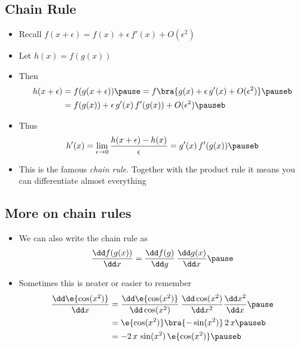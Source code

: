 \begin{slide}
\section[-2]{Chain Rule}

\begin{PauseHighLight}
  \begin{itemize}
  \item Recall $f(x+\epsilon) = f(x) + \epsilon\, f'(x) + O(\epsilon^2)$
  \item Let $h(x) = f(g(x))$\pause
  \item Then
    \begin{align*}
      h(x+\epsilon) &= f(g(x+\epsilon)) \pause= f\bra{g(x) + \epsilon\,g'(x) +
                      O(\epsilon^2)}\pauseb\\
      &= f(g(x)) + \epsilon\, g'(x)\, f'(g(x)) + O(\epsilon^2)\pauseb
    \end{align*}
  \item Thus
    \begin{align*}
      h'(x) =  \lim_{\epsilon\rightarrow 0} \frac{h(x+\epsilon)  -
      h(x)}{\epsilon} = g'(x)\, f'(g(x)) \pauseb
    \end{align*}
  \item This is the famous \emph{chain rule}\pauseb. Together with the
    product rule it means you can differentiate almost everything\pauseb
  \end{itemize}
\end{PauseHighLight}

\end{slide}


\begin{slide}
\section{More on chain rules}

\begin{PauseHighLight}
  \begin{itemize}
  \item We can also write the chain rule as
    \begin{align*}
      \frac{\dd f(g(x))}{\dd x} = \frac{\dd f(g)}{\dd g} \, \frac{\dd
      g(x)}{\dd x}\pause
    \end{align*}
  \item Sometimes this is neater or easier to remember
    \begin{align*}
      \frac{\dd \e{\cos(x^2)}}{\dd x}
      &= \frac{\dd \e{\cos(x^2)}}{\dd \cos(x^2)} \,
        \frac{\dd \cos(x^2)}{\dd x^2} \frac{\dd x^2}{\dd x}\pause\\
      &= \e{\cos(x^2)} \bra{-\sin(x^2)} \, 2\,x\pauseb  \\
      &= -2\, x\, \sin(x^2) \, \e{\cos(x^2)}\pauseb
    \end{align*}
  \end{itemize}
\end{PauseHighLight}

\end{slide}


